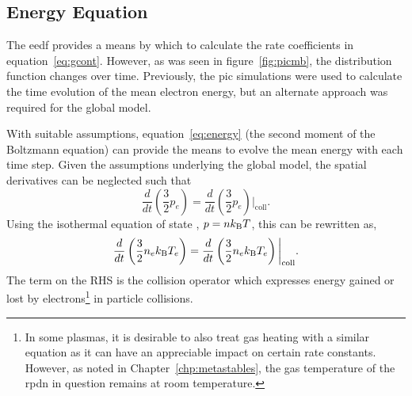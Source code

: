 \subsection{Energy Equation}

The \acs{eedf} provides a means by which to calculate the rate coefficients in
equation~\ref{eq:gcont}. However, as was seen in figure~\ref{fig:picmb}, the
distribution function changes over time. Previously, the \acs{pic} simulations
were used to calculate the time evolution of the mean electron energy, but an
alternate approach was required for the global model.

With suitable assumptions, equation~\ref{eq:energy} (the second moment of the
Boltzmann equation) can provide the means to evolve the mean energy with each
time step. Given the assumptions underlying the global model, the spatial
derivatives can be neglected such that
\begin{equation}
  \frac{d}{dt}\left(\frac{3}{2}p_e\right) =
  \frac{d}{dt}\left(\frac{3}{2}p_e\right)\bigg|_\mathrm{coll}.
\end{equation}
Using the isothermal equation of state \cite{Lieberman2005}, $p=nk_\mathrm{B} T$, this
can be rewritten as,
\begin{equation}
  \frac{d}{dt}\left(\frac{3}{2}n_ek_\mathrm{B} T_e \right) =
  \frac{d}{dt}\left(\frac{3}{2}n_ek_\mathrm{B} T_e \right)\bigg|_\mathrm{coll}.
  \label{eq:energy2}
\end{equation}
The term on the RHS is the collision operator which expresses energy gained or
lost by electrons\footnote{In some plasmas, it is desirable to also treat gas
heating with a similar equation as it can have an appreciable impact on certain
rate constants. However, as noted in Chapter~\ref{chp:metastables}, the gas
temperature of the \acs{rpdn} in question remains at room temperature.} in
particle collisions.

